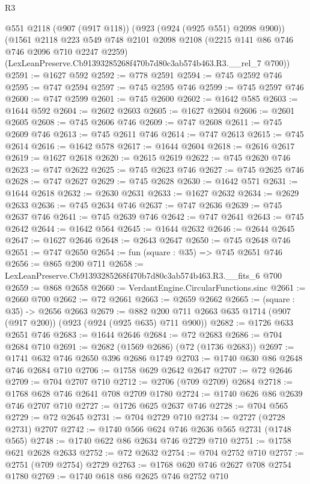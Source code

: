 \begin{lexlean}{R3}
\begin{coremodule}
    @551
    @2118
    (@907 (@917 @118))
    (@923 (@924 (@925 @551) @2098 @900))
    (@1561
      @2118
      @223
      @549
      @748
      @2101
      @2098
      @2108
      (@2215 @141 @86 @746 @746 @2096 @710 @2247 @2259)
      (LexLeanPreserve.Cb91393285268f470b7d80c3ab574b463.R3.__rel_7 @700))
@2591 := @1627 @592
@2592 := @778 @2591
@2594 := @745 @2592 @746
@2595 := @747 @2594
@2597 := @745 @2595 @746
@2599 := @745 @2597 @746
@2600 := @747 @2599
@2601 := @745 @2600
@2602 := @1642 @585
@2603 := @1644 @592
@2604 := @2602 @2603
@2605 := @1627 @2604
@2606 := @2601 @2605
@2608 := @745 @2606 @746
@2609 := @747 @2608
@2611 := @745 @2609 @746
@2613 := @745 @2611 @746
@2614 := @747 @2613
@2615 := @745 @2614
@2616 := @1642 @578
@2617 := @1644 @2604
@2618 := @2616 @2617
@2619 := @1627 @2618
@2620 := @2615 @2619
@2622 := @745 @2620 @746
@2623 := @747 @2622
@2625 := @745 @2623 @746
@2627 := @745 @2625 @746
@2628 := @747 @2627
@2629 := @745 @2628
@2630 := @1642 @571
@2631 := @1644 @2618
@2632 := @2630 @2631
@2633 := @1627 @2632
@2634 := @2629 @2633
@2636 := @745 @2634 @746
@2637 := @747 @2636
@2639 := @745 @2637 @746
@2641 := @745 @2639 @746
@2642 := @747 @2641
@2643 := @745 @2642
@2644 := @1642 @564
@2645 := @1644 @2632
@2646 := @2644 @2645
@2647 := @1627 @2646
@2648 := @2643 @2647
@2650 := @745 @2648 @746
@2651 := @747 @2650
@2654 := fun (square : @35) => @745 @2651 @746
@2656 := @865 @200 @711
@2658 := LexLeanPreserve.Cb91393285268f470b7d80c3ab574b463.R3.__fits_6 @700
@2659 := @868 @2658
@2660 := VerdantEngine.CircularFunctions.sinc
@2661 := @2660 @700
@2662 := @72 @2661
@2663 := @2659 @2662
@2665 := (square : @35) -> @2656 @2663
@2679 := @882 @200 @711 @2663 @635 @1714 (@907 (@917 @200)) (@923 (@924 (@925 @635) @711 @900))
@2682 := @1726 @633 @2651 @746
@2683 := @1644 @2646
@2684 := @72 @2683
@2686 := @704 @2684 @710
@2691 := @2682 (@1569 @2686) (@72 (@1736 @2683))
@2697 := @1741 @632 @746 @2650 @396 @2686 @1749
@2703 := @1740 @630 @86 @2648 @746 @2684 @710
@2706 := @1758 @629 @2642 @2647
@2707 := @72 @2646
@2709 := @704 @2707 @710
@2712 := @2706 (@709 @2709) @2684
@2718 := @1768 @628 @746 @2641 @708 @2709 @1780
@2724 := @1740 @626 @86 @2639 @746 @2707 @710
@2727 := @1726 @625 @2637 @746
@2728 := @704 @565
@2729 := @72 @2645
@2731 := @704 @2729 @710
@2734 := @2727 (@2728 @2731) @2707
@2742 := @1740 @566 @624 @746 @2636 @565 @2731 (@1748 @565)
@2748 := @1740 @622 @86 @2634 @746 @2729 @710
@2751 := @1758 @621 @2628 @2633
@2752 := @72 @2632
@2754 := @704 @2752 @710
@2757 := @2751 (@709 @2754) @2729
@2763 := @1768 @620 @746 @2627 @708 @2754 @1780
@2769 := @1740 @618 @86 @2625 @746 @2752 @710

\end{coremodule}
\end{lexlean}
